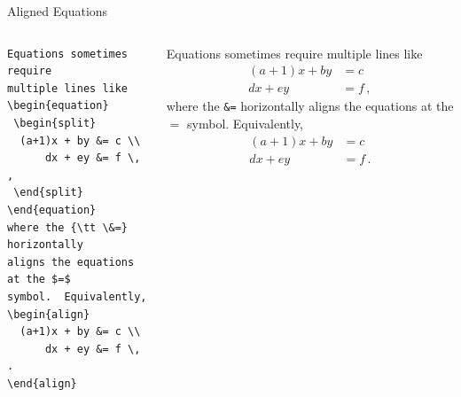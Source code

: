 \documentclass[aspectratio=1610]{beamer}
\begin{document}
\begin{frame}[fragile]{Aligned Equations}
  \begin{columns}[T]
      \begin{lstlisting}
Equations sometimes require
multiple lines like
\begin{equation}
 \begin{split}
  (a+1)x + by &= c \\
      dx + ey &= f \, ,
 \end{split}
\end{equation}
where the {\tt \&=} horizontally 
aligns the equations at the $=$ 
symbol.  Equivalently,
\begin{align}
  (a+1)x + by &= c \\
      dx + ey &= f \, .
\end{align}
      \end{lstlisting}
Equations sometimes require
multiple lines like
\begin{equation}
 \begin{split}
  (a+1)x + by &= c \\
      dx + ey &= f \, ,
 \end{split}
\end{equation}
where the {\tt \&=} horizontally 
aligns the equations at the $=$ 
symbol.  Equivalently,
\begin{align}
  (a+1)x + by &= c \\
      dx + ey &= f \, .
\end{align}
  \end{columns}
\end{frame}
\end{document}

